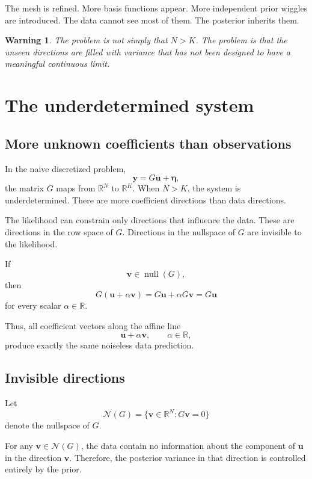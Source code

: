 \documentclass[11pt,a4paper]{book}
\newtheorem{warning}[definition]{Warning}
\begin{document}
The mesh is refined. More basis functions appear. More independent prior
wiggles are introduced. The data cannot see most of them. The posterior inherits
them.

\begin{warning}
The problem is not simply that $N>K$. The problem is that the unseen directions
are filled with variance that has not been designed to have a meaningful
continuous limit.
\end{warning}

\section{The underdetermined system}

\subsection{More unknown coefficients than observations}

In the naive discretized problem,
\[
    \bm{y} = G\bm{u} + \bm{\eta},
\]
the matrix $G$ maps from $\mathbb{R}^N$ to $\mathbb{R}^K$. When $N>K$, the
system is underdetermined. There are more coefficient directions than data
directions.

The likelihood can constrain only directions that influence the data. These are
directions in the row space of $G$. Directions in the nullspace of $G$ are
invisible to the likelihood.

If
\[
    \bm{v} \in \operatorname{null}(G),
\]
then
\[
    G(\bm{u}+\alpha \bm{v})
    =
    G\bm{u}
    +
    \alpha G\bm{v}
    =
    G\bm{u}
\]
for every scalar $\alpha \in \mathbb{R}$.

Thus, all coefficient vectors along the affine line
\[
    \bm{u} + \alpha\bm{v},
    \qquad
    \alpha \in \mathbb{R},
\]
produce exactly the same noiseless data prediction.

\subsection{Invisible directions}

Let
\[
    \mathcal{N}(G)
    =
    \{\bm{v}\in\mathbb{R}^N : G\bm{v}=0\}
\]
denote the nullspace of $G$.

For any $\bm{v}\in \mathcal{N}(G)$, the data contain no information about the
component of $\bm{u}$ in the direction $\bm{v}$. Therefore, the posterior
variance in that direction is controlled entirely by the prior.
\end{document}
